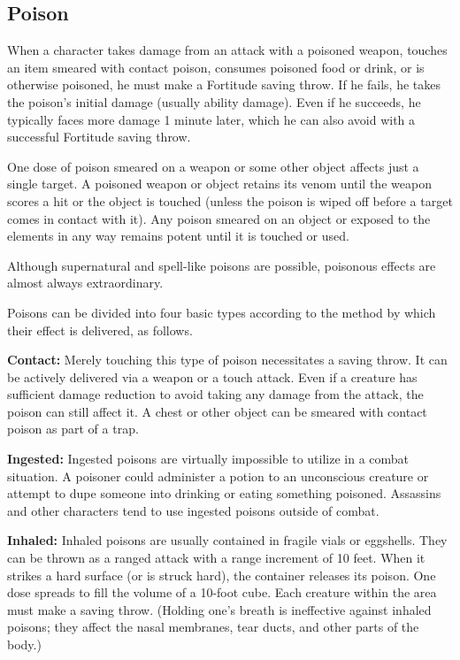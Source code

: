 \subsection{Poison}

When a character takes damage from an attack with a poisoned weapon, touches an 
item smeared with contact poison, consumes poisoned food or drink, or is otherwise 
poisoned, he must make a Fortitude saving throw. If he fails, he takes the poison's 
initial damage (usually ability damage). Even if he succeeds, he typically faces 
more damage 1 minute later, which he can also avoid with a successful Fortitude 
saving throw.

One dose of poison smeared on a weapon or some other object affects just a single 
target. A poisoned weapon or object retains its venom until the weapon scores a 
hit or the object is touched (unless the poison is wiped off before a target comes 
in contact with it). Any poison smeared on an object or exposed to the elements 
in any way remains potent until it is touched or used.

Although supernatural and spell-like poisons are possible, poisonous effects are 
almost always extraordinary.

Poisons can be divided into four basic types according to the method by which their 
effect is delivered, as follows.

\textbf{Contact:} Merely touching this type of poison necessitates a saving throw. 
It can be actively delivered via a weapon or a touch attack. Even if a creature 
has sufficient damage reduction to avoid taking any damage from the attack, the 
poison can still affect it. A chest or other object can be smeared with contact 
poison as part of a trap.

\textbf{Ingested:} Ingested poisons are virtually impossible to utilize in a combat 
situation. A poisoner could administer a potion to an unconscious creature or attempt 
to dupe someone into drinking or eating something poisoned. Assassins and other 
characters tend to use ingested poisons outside of combat.

\textbf{Inhaled:} Inhaled poisons are usually contained in fragile vials or eggshells. 
They can be thrown as a ranged attack with a range increment of 10 feet. When it 
strikes a hard surface (or is struck hard), the container releases its poison. 
One dose spreads to fill the volume of a 10-foot cube. Each creature within the 
area must make a saving throw. (Holding one's breath is ineffective against inhaled 
poisons; they affect the nasal membranes, tear ducts, and other parts of the body.)

